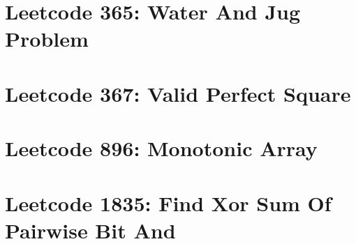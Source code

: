 \documentclass{article}
\begin{document}
\section*{Leetcode 365: Water And Jug Problem}

\pagebreak 

\section*{Leetcode 367: Valid Perfect Square}

\pagebreak 

\section*{Leetcode 896: Monotonic Array}

\pagebreak 

\section*{Leetcode 1835: Find Xor Sum Of Pairwise Bit And}

\pagebreak 
\end{document}

